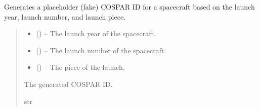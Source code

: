 \documentclass[letterpaper,10pt,english]{sphinxmanual}
\begin{document}
\begin{fulllineitems}
\label{\detokenize{fspsim.utils:fspsim.utils.Conversions.generate_cospar_id}}
\pysigstartsignatures
{}
\pysigstopsignatures
\sphinxAtStartPar
Generates a placeholder (fake) COSPAR ID for a spacecraft based on the launch year, launch number, and launch piece.
\begin{quote}\begin{description}
\begin{itemize}
\item {} 
\sphinxAtStartPar
{} () – The launch year of the spacecraft.

\item {} 
\sphinxAtStartPar
{} () – The launch number of the spacecraft.

\item {} 
\sphinxAtStartPar
{} () – The piece of the launch.

\end{itemize}

\sphinxAtStartPar
The generated COSPAR ID.

\sphinxAtStartPar
str

\end{description}\end{quote}

\end{fulllineitems}

\end{document}

